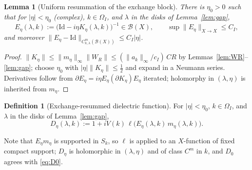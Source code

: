 \documentclass[11pt,a4paper]{amsart}
\newtheorem{lemma}[theorem]{Lemma}
\theoremstyle{definition}
\newtheorem{definition}[theorem]{Definition}
\theoremstyle{remark}
\newcommand{\Id}{\mathrm{Id}}
\newcommand{\ellf}{\ell}
\begin{document}
\begin{lemma}[Uniform resummation of the exchange block]\label{lem:neumann}
There is $\eta_0>0$ such that for $|\eta|<\eta_0$ \textup{(}complex\textup{)}, $k\in\Omega_I$, and $\lambda$ in the disks of Lemma~\textup{\ref{lem:gap}},
\begin{equation}\label{eq:E}
E_\eta(\lambda,k):=\bigl(\Id-i\eta K_\eta(\lambda,k)\bigr)^{-1}\in\mathcal B(X),\qquad
\sup\|E_\eta\|_{X\to X}\le C_I,
\end{equation}
and moreover $\|E_\eta-\Id\|_{C^m_{k,\lambda}(\mathcal B(X))}\le C_I|\eta|$.
\end{lemma}

\begin{proof}
$\|K_\eta\|\le\|m_\eta\|_\infty\|W_R\|\le(\|a_k\|_\infty/c_I)\,CR$ by Lemmas~\ref{lem:WR}--\ref{lem:gap}; choose $\eta_0$ with $|\eta|\|K_\eta\|\le\frac12$ and expand in a Neumann series. Derivatives follow from $\partial E_\eta=i\eta E_\eta(\partial K_\eta)E_\eta$ iterated; holomorphy in $(\lambda,\eta)$ is inherited from $m_\eta$.
\end{proof}

\begin{definition}[Exchange-resummed dielectric function]\label{def:Deta}
For $|\eta|<\eta_0$, $k\in\Omega_I$, and $\lambda$ in the disks of Lemma~\ref{lem:gap},
\begin{equation}\label{eq:Deta}
D_\eta(\lambda,k):=1+iV(k)\,\ellf\bigl(E_\eta(\lambda,k)\,m_\eta(\lambda,k)\bigr).
\end{equation}
\end{definition}
Note that $E_\eta m_\eta$ is supported in $S_k$, so $\ellf$ is applied to an $X$-function of fixed compact support; $D_\eta$ is holomorphic in $(\lambda,\eta)$ and of class $C^m$ in $k$, and $D_0$ agrees with \eqref{eq:D0}.
\end{document}
